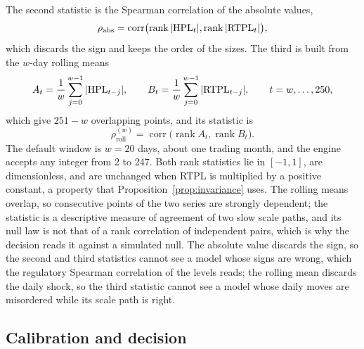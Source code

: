 The second statistic is the Spearman correlation of the absolute values,
\begin{equation}
\rho_{\mathrm{abs}}=\operatorname{corr}\bigl(\operatorname{rank}|\mathrm{HPL}_t|,\operatorname{rank}|\mathrm{RTPL}_t|\bigr),
\label{eq:rho-abs}
\end{equation}
which discards the sign and keeps the order of the sizes.
The third is built from the $w$-day rolling means
\begin{equation}
A_t=\frac1w\sum_{j=0}^{w-1}|\mathrm{HPL}_{t-j}|,\qquad B_t=\frac1w\sum_{j=0}^{w-1}|\mathrm{RTPL}_{t-j}|,\qquad t=w,\dots,250,
\label{eq:rolling}
\end{equation}
which give $251-w$ overlapping points, and its statistic is
\begin{equation}
\rho_{\mathrm{roll}}^{(w)}=\operatorname{corr}\bigl(\operatorname{rank}A_t,\operatorname{rank}B_t\bigr).
\label{eq:rho-roll}
\end{equation}
The default window is $w=20$ days, about one trading month, and the engine accepts any integer from 2 to 247.
Both rank statistics lie in $[-1,1]$, are dimensionless, and are unchanged when RTPL is multiplied by a positive constant, a property that Proposition~\ref{prop:invariance} uses.
The rolling means overlap, so consecutive points of the two series are strongly dependent; the statistic is a descriptive measure of agreement of two slow scale paths, and its null law is not that of a rank correlation of independent pairs, which is why the decision reads it against a simulated null.
The absolute value discards the sign, so the second and third statistics cannot see a model whose signs are wrong, which the regulatory Spearman correlation of the levels reads; the rolling mean discards the daily shock, so the third statistic cannot see a model whose daily moves are misordered while its scale path is right.

\subsection{Calibration and decision}
\label{sec:method-calibration}

